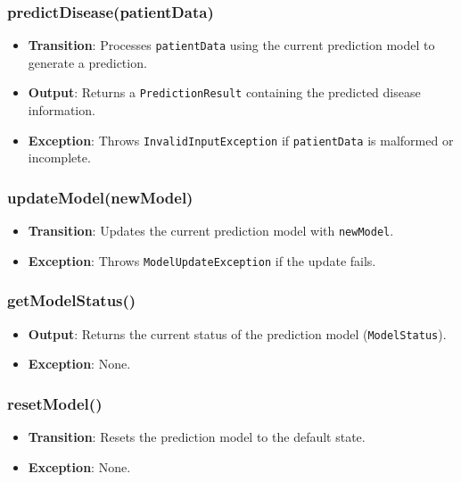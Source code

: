 \documentclass[12pt, titlepage]{article}
\begin{document}
\subsubsection{predictDisease(patientData)}

\begin{itemize}
    \item \textbf{Transition}: Processes \texttt{patientData} using the current prediction model to generate a prediction.
    \item \textbf{Output}: Returns a \texttt{PredictionResult} containing the predicted disease information.
    \item \textbf{Exception}: Throws \texttt{InvalidInputException} if \texttt{patientData} is malformed or incomplete.
\end{itemize}

\subsubsection{updateModel(newModel)}

\begin{itemize}
    \item \textbf{Transition}: Updates the current prediction model with \texttt{newModel}.
    \item \textbf{Exception}: Throws \texttt{ModelUpdateException} if the update fails.
\end{itemize}

\subsubsection{getModelStatus()}

\begin{itemize}
    \item \textbf{Output}: Returns the current status of the prediction model (\texttt{ModelStatus}).
    \item \textbf{Exception}: None.
\end{itemize}

\subsubsection{resetModel()}

\begin{itemize}
    \item \textbf{Transition}: Resets the prediction model to the default state.
    \item \textbf{Exception}: None.
\end{itemize}
\end{document}
